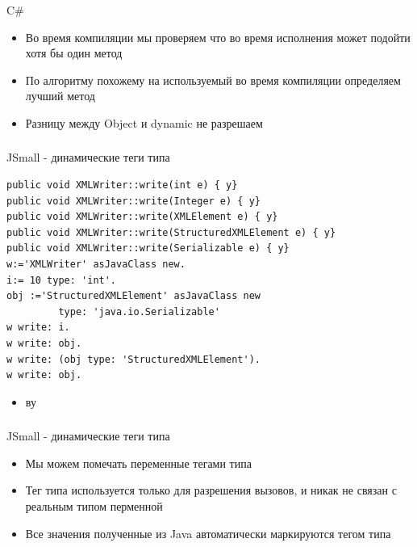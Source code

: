 \documentclass[t]{beamer}  %
\begin{document}
\begin{frame}[fragile]
	\frametitle{\insertsection} 
  	\framesubtitle{\insertsubsection}
    \begin{block}{C\#}
\begin{itemize}
\item Во время компиляции мы проверяем что во время исполнения может подойти хотя бы один метод
\item По алгоритму похожему на используемый во время компиляции определяем лучший метод
\item Разницу между Object и dynamic не разрешаем
\end{itemize}
    \end{block}
\end{frame}

\begin{frame}[fragile]
	\frametitle{\insertsection} 
  	\framesubtitle{\insertsubsection}
    \begin{block}{JSmall - динамические теги типа}
    	    \begin{verbatim}
public void XMLWriter::write(int e) { y}
public void XMLWriter::write(Integer e) { y}
public void XMLWriter::write(XMLElement e) { y}
public void XMLWriter::write(StructuredXMLElement e) { y}
public void XMLWriter::write(Serializable e) { y}
w:='XMLWriter' asJavaClass new.
i:= 10 type: 'int'.
obj :='StructuredXMLElement' asJavaClass new
         type: 'java.io.Serializable'
w write: i.
w write: obj.
w write: (obj type: 'StructuredXMLElement').
w write: obj.
		\end{verbatim}
\begin{itemize}
\item ву
\end{itemize}
    \end{block}
\end{frame}

\begin{frame}[fragile]
	\frametitle{\insertsection} 
  	\framesubtitle{\insertsubsection}
    \begin{block}{JSmall - динамические теги типа}
\begin{itemize}
\item Мы можем помечать переменные тегами типа
\item Тег типа используется только для разрешения вызовов, и никак не связан с реальным типом перменной
\item Все значения полученные из Java автоматически маркируются тегом типа
\end{itemize}
    \end{block}
\end{frame}
\end{document}
